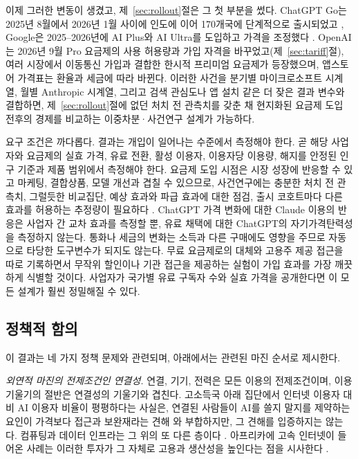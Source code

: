 \documentclass[11pt]{article}
\theoremstyle{definition}
\theoremstyle{remark}
\begin{document}
이제 그러한 변동이 생겼고, 제~\ref{sec:rollout}절은 그 첫 부분을 썼다. ChatGPT Go는 2025년 8월에서 2026년 1월 사이에 인도에 이어 170개국에 단계적으로 출시되었고 \citep{openai2026go}, Google은 2025--2026년에 AI Plus와 AI Ultra를 도입하고 가격을 조정했다 \citep{google2026io}. OpenAI는 2026년 9월 Pro 요금제의 사용 허용량과 가입 자격을 바꾸었고(제~\ref{sec:tariff}절), 여러 시장에서 이동통신 가입과 결합한 한시적 프리미엄 요금제가 등장했으며, 앱스토어 가격표는 환율과 세금에 따라 바뀐다. 이러한 사건을 분기별 마이크로소프트 시계열, 월별 Anthropic 시계열, 그리고 검색 관심도나 앱 설치 같은 더 잦은 결과 변수와 결합하면, 제~\ref{sec:rollout}절에 없던 처치 전 관측치를 갖춘 채 현지화된 요금제 도입 전후의 경제를 비교하는 이중차분·사건연구 설계가 가능하다.

요구 조건은 까다롭다. 결과는 개입이 일어나는 수준에서 측정해야 한다. 곧 해당 사업자와 요금제의 실효 가격, 유료 전환, 활성 이용자, 이용자당 이용량, 해지를 안정된 인구 기준과 제품 범위에서 측정해야 한다. 요금제 도입 시점은 시장 성장에 반응할 수 있고 마케팅, 결합상품, 모델 개선과 겹칠 수 있으므로, 사건연구에는 충분한 처치 전 관측치, 그럴듯한 비교집단, 예상 효과와 파급 효과에 대한 점검, 출시 코호트마다 다른 효과를 허용하는 추정량이 필요하다 \citep{callaway2021did}. ChatGPT 가격 변화에 대한 Claude 이용의 반응은 사업자 간 교차 효과를 측정할 뿐, 유료 채택에 대한 ChatGPT의 자기가격탄력성을 측정하지 않는다. 통화나 세금의 변화는 소득과 다른 구매에도 영향을 주므로 자동으로 타당한 도구변수가 되지도 않는다. 무료 요금제로의 대체와 고용주 제공 접근을 따로 기록하면서 무작위 할인이나 기관 접근을 제공하는 실험이 가입 효과를 가장 깨끗하게 식별할 것이다. 사업자가 국가별 유료 구독자 수와 실효 가격을 공개한다면 이 모든 설계가 훨씬 정밀해질 수 있다.

\subsection{정책적 함의}

이 결과는 네 가지 정책 문제와 관련되며, 아래에서는 관련된 마진 순서로 제시한다.

\emph{외연적 마진의 전제조건인 연결성.} 연결, 기기, 전력은 모든 이용의 전제조건이며, 이용 기울기의 절반은 연결성의 기울기와 겹친다. 고소득국 아래 집단에서 인터넷 이용자 대비 AI 이용자 비율이 평평하다는 사실은, 연결된 사람들이 AI를 쓸지 말지를 제약하는 요인이 가격보다 접근과 보완재라는 견해 \citep{worldbank2026wdr,itu2025ff}와 부합하지만, 그 견해를 입증하지는 않는다. 컴퓨팅과 데이터 인프라는 그 위의 또 다른 층이다 \citep{lehdonvirta2024compute}. 아프리카에 고속 인터넷이 들어온 사례는 이러한 투자가 그 자체로 고용과 생산성을 높인다는 점을 시사한다 \citep{hjort2019arrival}.
\end{document}
